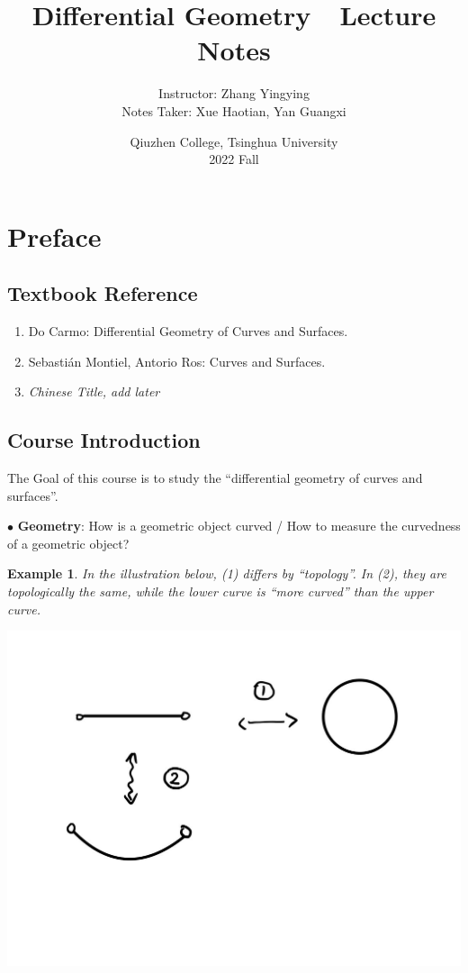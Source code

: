 \documentclass[UTF8,oneside,11pt]{book}
\title{
    \huge{Differential Geometry~~Lecture Notes}
    \vspace{0.4\paperheight}
}
\author{
    \Large{Instructor: Zhang Yingying}\\
    \Large{Notes Taker: Xue Haotian, Yan Guangxi}
    \vspace{0.1\paperheight}
}
\date{
    \Large{Qiuzhen College, Tsinghua University}\\
    \Large{2022 Fall}
}
\theoremstyle{plain}\newtheorem{thm}{Theorem}
\theoremstyle{definition}\newtheorem{defn}[thm]{Definition}
\theoremstyle{plain}\newtheorem{axiom}[thm]{Axiom}
\theoremstyle{plain}\newtheorem{coro}[thm]{Corollary}
\theoremstyle{plain}\newtheorem{lemma}[thm]{Lemma}
\theoremstyle{plain}\newtheorem{prop}[thm]{Proposition}
\theoremstyle{plain}\newtheorem{conj}[thm]{Conjecture}
\theoremstyle{plain}\newtheorem{ques}[thm]{Problem}
\theoremstyle{plain}\newtheorem{const}[thm]{Construction}
\theoremstyle{remark}\newtheorem{notation}[thm]{Notation}
\theoremstyle{plain}\newtheorem*{app}{Application}
\theoremstyle{plain}\newtheorem*{exam}{Example}
\theoremstyle{plain}\newtheorem*{exer}{Exercise}
\theoremstyle{remark}\newtheorem*{remark}{Remark}
\theoremstyle{remark}\newtheorem*{note}{\small{Note}}
\numberwithin{equation}{section}
\numberwithin{thm}{section}
\begin{document}
\maketitle
\frontmatter
\tableofcontents
\newpage


\mainmatter
\chapter*{\centering Preface}
\section*{Textbook Reference}
\begin{enumerate}[(1)]
    \item Do Carmo: Differential Geometry of Curves and Surfaces.
    \item Sebasti\'an Montiel, Antorio Ros: Curves and Surfaces.
    \item \textit{Chinese Title, add later}
\end{enumerate}
\section*{Course Introduction}
The Goal of this course is to study the ``differential geometry of curves and surfaces''.

\noindent
$\bullet$ \textbf{Geometry}: How is a geometric object curved / How to measure the curvedness of a geometric object? 
\begin{exam}
     In the illustration below, (1) differs by ``topology''. In (2), they are topologically the same, while the lower curve is ``more curved'' than the upper curve.
\end{exam}

\begin{center}
    \includegraphics[scale=0.3]{picture/preface_example1.jpg}
\end{center}
\end{document}
